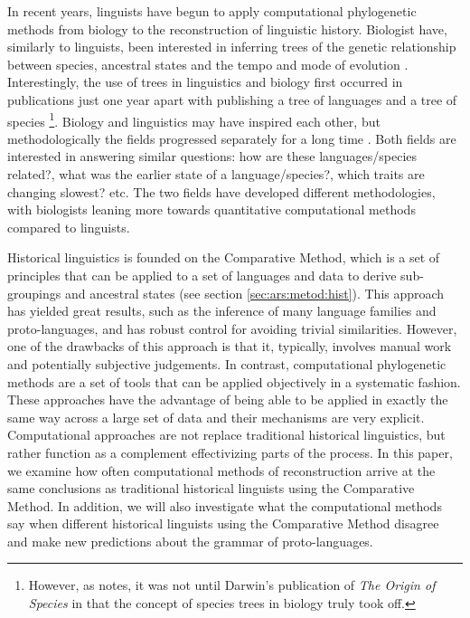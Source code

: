 \documentclass[a4paper,10pt]{article} %
\begin{document}
In recent years, linguists have begun to apply computational phylogenetic methods from biology to the reconstruction of linguistic history. Biologist have, similarly to linguists, been interested in inferring trees of the genetic relationship between species, ancestral states and the tempo and mode of evolution \citep{atkinson2005curious}. Interestingly, the use of trees in linguistics and biology first occurred in publications just one year apart with \citet{schlegel1808sprache} publishing a tree of languages and \citet{lamarck1809philosophie} a tree of species \footnote{However, as 
 \citet[370]{greenhill2015evolution} notes, it was not until Darwin's publication of \emph{The Origin of Species} in  \citeyear{darwin1859origin} that the concept of species trees in biology truly took off.}. Biology and linguistics may have inspired each other, but methodologically the fields progressed separately for a long time \citep[370]{greenhill2015evolution}. Both fields are interested in answering similar questions: how are these languages/species related?, what was the earlier state of a language/species?, which traits are changing slowest? etc. The two fields have developed different methodologies, with biologists leaning more towards quantitative computational methods compared to linguists.
 
Historical linguistics is founded on the Comparative Method, which is a set of principles that can be applied to a set of languages and data to derive sub-groupings and ancestral states (see section \ref{sec:ars:metod:hist}). This approach has yielded great results, such as the inference of many language families and proto-languages, and has robust control for avoiding trivial similarities. However, one of the drawbacks of this approach is that it, typically, involves manual work and potentially subjective judgements. In contrast, computational phylogenetic methods are a set of tools that can be applied objectively in a systematic fashion. These approaches have the advantage of being able to be applied in exactly the same way across a large set of data and their mechanisms are very explicit. Computational approaches are not replace traditional historical linguistics, but rather function as a complement effectivizing parts of the process. In this paper, we examine how often computational methods of reconstruction arrive at the same conclusions as traditional historical linguists using the Comparative Method. In addition, we will also investigate what the computational methods say when different historical linguists using the Comparative Method disagree and make new predictions about the grammar of proto-languages.
\end{document}
